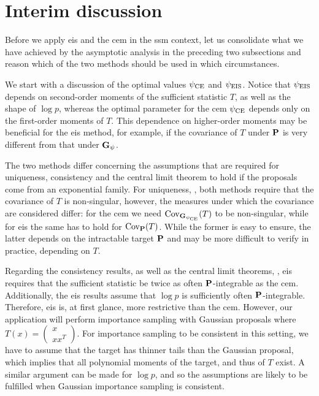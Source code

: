 \section{Interim discussion}
\label{sec:interim-discussion}

Before we apply \acrshort{eis} and the \acrshort{cem} in the \acrshort{ssm} context, let us consolidate what we have achieved by the asymptotic analysis in the preceding two subsections and reason which of the two methods should be used in which circumstances.

We start with a discussion of the optimal values $\pce$ and $\peis$.
Notice that $\peis$ depends on second-order moments of the sufficient statistic $T$, as well as the shape of $\log p$, whereas the optimal parameter for the \gls{cem} $\pce$ depends only on the first-order moments of $T$. 
This dependence on higher-order moments may be beneficial for the \acrshort{eis} method, for example, if the covariance of $T$ under $\P$ is very different from that under $\G_{\psi}$. 


The two methods differ concerning the assumptions that are required for uniqueness, consistency and the central limit theorem to hold if the proposals come from an exponential family. 
For uniqueness, , both methods require that the covariance of $T$ is non-singular, however, the measures under which the covariance are considered differ: for the \acrshort{cem} we need $\cov_{\G_{\pce}} (T)$ to be non-singular, while for \acrshort{eis} the same has to hold for $\cov_{\P} (T)$. While the former is easy to ensure, the latter depends on the intractable target $\P$ and may be more difficult to verify in practice, depending on $T$. 

Regarding the consistency results,  as well as the central limit theorems, , \acrshort{eis} requires that the sufficient statistic be twice as often $\P$-integrable as the \acrshort{cem}. Additionally, the \acrshort{eis} results assume that $\log p$ is sufficiently often $\P$-integrable. Therefore, \acrshort{eis} is, at first glance, more restrictive than the \acrshort{cem}. However, our application will perform importance sampling with Gaussian proposals where $T(x) = \begin{pmatrix} x \\ xx^{T}\end{pmatrix}$. For importance sampling to be consistent in this setting, we have to assume that the target has thinner tails than the Gaussian proposal, which implies that all polynomial moments of the target, and thus of $T$ exist. A similar argument can be made for $\log p$, and so the assumptions are likely to be fulfilled when Gaussian importance sampling is consistent.

